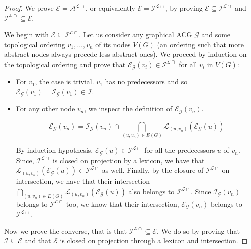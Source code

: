 \documentclass{llncs}
\begin{document}
\begin{proof}
  We prove $\mathcal{E} = \mathcal{A}^{\mathcal{L}{\cap}}$, or equivalently
  $\mathcal{E} = \mathcal{I}^{\mathcal{L}{\cap}}$, by proving $\mathcal{E}
  \subseteq \mathcal{I}^{\mathcal{L}{\cap}}$ and
  $\mathcal{I}^{\mathcal{L}{\cap}} \subseteq \mathcal{E}$.

  We begin with $\mathcal{E} \subseteq \mathcal{I}^{\mathcal{L}{\cap}}$. Let
  us consider any graphical ACG $\mathcal{G}$ and some topological ordering
  $v_1, \ldots, v_n$ of its nodes $V(G)$ (an ordering such that more abstract
  nodes always precede less abstract ones). We proceed by induction on the
  topological ordering and prove that $\mathcal{E}_{\mathcal{G}}(v_i) \in
  \mathcal{I}^{\mathcal{L}{\cap}}$ for all $v_i$ in $V(G)$:

  \begin{itemize}
  \item For $v_1$, the case is trivial. $v_1$ has no predecessors and so
    $\mathcal{E}_{\mathcal{G}}(v_1) = \mathcal{I}_{\mathcal{G}}(v_1) \in
    \mathcal{I}$.
  \item For any other node $v_n$, we inspect the definition of
    $\mathcal{E}_{\mathcal{G}}(v_n)$.

    $$\mathcal{E}_{\mathcal{G}}(v_n) = \mathcal{I}_{\mathcal{G}}(v_n) \cap
    \bigcap_{(u,v_n) \in E(G)}
    \mathcal{L}_{(u,v_n)}(\mathcal{E}_{\mathcal{G}}(u))$$

    By induction hypothesis, $\mathcal{E}_{\mathcal{G}}(u) \in
    \mathcal{I}^{\mathcal{L}{\cap}}$ for all the predecessors $u$ of
    $v_n$. Since, $\mathcal{I}^{\mathcal{L}{\cap}}$ is closed on projection by
    a lexicon, we have that
    $\mathcal{L}_{(u,v_n)}(\mathcal{E}_{\mathcal{G}}(u)) \in
    \mathcal{I}^{\mathcal{L}{\cap}}$ as well. Finally, by the closure of
    $\mathcal{I}^{\mathcal{L}{\cap}}$ on intersection, we have that their
    intersection $\bigcap_{(u,v_n) \in E(G)}
    \mathcal{L}_{(u,v_n)}(\mathcal{E}_{\mathcal{G}}(u))$ also belongs to
    $\mathcal{I}^{\mathcal{L}{\cap}}$. Since $\mathcal{I}_{\mathcal{G}}(v_n)$
    belongs to $\mathcal{I}^{\mathcal{L}{\cap}}$ too, we know that their
    intersection, $\mathcal{E}_{\mathcal{G}}(v_n)$ belongs to
    $\mathcal{I}^{\mathcal{L}{\cap}}$.
  \end{itemize}

  Now we prove the converse, that is that $\mathcal{I}^{\mathcal{L}{\cap}}
  \subseteq \mathcal{E}$. We do so by proving that $\mathcal{I} \subseteq
  \mathcal{E}$ and that $\mathcal{E}$ is closed on projection through a
  lexicon and intersection.


\end{proof}
\end{document}
